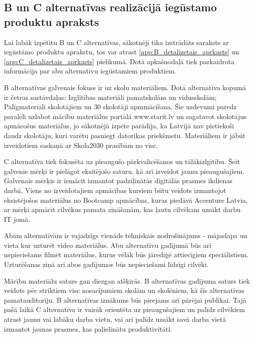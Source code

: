\subsection{B un C alternatīvas realizācijā iegūstamo produktu apraksts}
Lai labāk izpētītu B un C alternatīvas, sākotnēji tika izstrādāts saraksts ar iegūstāmo produktu
aprakstu, tos var atrast \ref{app:B_detalizetais_aprkasts} un \ref{app:C_detalizetais_aprkasts} pielikumā.
Dotā apkašnodaļā tiek paskaidrota informācija par abu alternatīvu iegūstamiem produktiem.
\par
B alternatīvas galvenais fokuss ir uz skolu materiāliem. Dotā alternatīva kopumā ir četras sastāvdaļas:
Izglītības materiāli pamatskolām un vidusskolām; Palīgmateriāli skolotājiem un 30 skolotāji apmmācīšana.
Šie uzdevumi paredz paralēli uzlabot mācību materiālus portālā www.starit.lv un sagatavot skolotājus
apmācošus materiālus, jo sākotnējā izpēte parādīja, ka Latvijā nav pietiekoši daudz skolotāju, kuri varētu
pasniegt datorikas priekšmetu. Materiāliem ir jābūt izveidotiem saskaņā ar Skola2030 prasībām no \acrshort{visc}.
\par
C alternatīva tiek fokusēta uz pieaugušo pārkvalicēšanos un tālākizlgītību. Šeit galvenie mērķi ir pielāgot
eksitējošo saturu, kā arī izveidot jaunu pieaugušajiem. Galvenais mērķis ir iemācīt izmantot padziļinātās 
digitālās prasmes ikdienas darbā. Viens no izveidotajiem apmācības kursiem būtu veidots izmantojot eksistējošos
materiālus no Bootcamp apmācības, kuras piedāvā Accenture Latvia, ar mērķi apmācīt cilvēkus pamata zināšanām, 
kas ļautu cilvēkam uzsākt darbu IT jomā. 
\par
Abām alternatīvām ir vajadzīgs vienāds tehniskais nodrošinājums - mājaslapa un vieta kur uzturēt video materiālus.
Abu alternatīvu gadījumā būs arī nepieciešams filmēt materiālus, kurus vēlāk būs jārediģē attiecīgiem speciālistiem.
Uzturēšanas ziņā arī abos gadījumos būs nepieciešami līdzīgi cilvēki.
\par
Mācību materiālu saturs gan diezgan atšķirās. B alternatīvas gadījuma saturs tiek veidots pēc striktiem \acrshort{visc}
nosacījumiem skolām un skolēniem, kā šīs alternatīvas pamatauditoriju. B alternatīvas iznākums būs pieejams arī
pārējai publikai. Tajā pašā laikā C alternatīva ir vairāk orientēta uz pieaugušajiem un palīdz cilvēkiem atrast
jaunu vai labāku darba vietu, vai arī palīdz uzsākt savā darba vietā izmantot jaunas prasmes, kas palielinātu 
produktivitāti.
